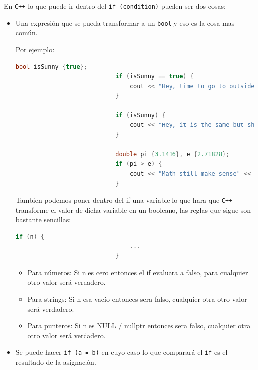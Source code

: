\documentclass[12pt, fleqn]{report}                             %
\theoremstyle{break}                                            %
\newcommand{\textCode}[1]  { \texttt{#1} }                      %
\newcommand{\Cpp}{\ignorespaces\textCode{C++}}                  %
\begin{document}
                En \Cpp lo que puede ir dentro del \textCode{if (condition)} pueden ser dos cosas:
                \begin{itemize}
                    \item Una expresión que se pueda transformar a un \textCode{bool} y eso es la cosa
                        mas común.

                        Por ejemplo:
                        \begin{lstlisting}[language=C++, gobble=28]
                            bool isSunny {true};
                            if (isSunny == true) {
                                cout << "Hey, time to go to outside" << '\n';
                            }

                            if (isSunny) {
                                cout << "Hey, it is the same but shorter syntax" << '\n';
                            }

                            double pi {3.1416}, e {2.71828};
                            if (pi > e) {
                                cout << "Math still make sense" << '\n';
                            }
                        \end{lstlisting}

                        Tambien podemos poner dentro del if una variable lo que hara
                        que \Cpp transforme el valor de dicha variable en un booleano,
                        las reglas que sigue son bastante sencillas:
                        \begin{lstlisting}[language=C++, gobble=28]
                            if (n) {
                                ...
                            }
                        \end{lstlisting}
                        \begin{itemize}
                            \item Para números: Si n es cero entonces el if evaluara a falso, para
                                cualquier otro valor será verdadero. 
                            \item Para strings: Si n esa vacío entonces sera falso, cualquier otra
                                otro valor será verdadero. 
                            \item Para punteros: Si n es NULL / nullptr entonces sera falso, cualquier otra
                                otro valor será verdadero. 
                        \end{itemize}

                    \item Se puede hacer \textCode{if (a = b)} en cuyo caso lo que comparará el 
                        \textCode{if} es el resultado de la asignación.
                \end{itemize}
\end{document}
